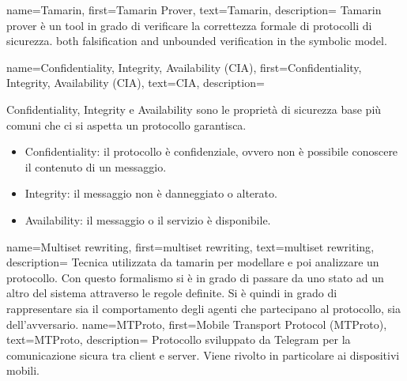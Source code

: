 {
    name={Tamarin},
    first={Tamarin Prover},
    text={Tamarin},
    description={
            Tamarin prover è un tool in grado di verificare la correttezza formale di protocolli di sicurezza.
            both falsification and unbounded verification in the symbolic model.
        }
}
{
    name={Confidentiality, Integrity, Availability (CIA)},
    first={Confidentiality, Integrity, Availability (CIA)},
    text={CIA},
    description={
            Confidentiality, Integrity e Availability sono le proprietà di sicurezza base più comuni che ci si aspetta un protocollo garantisca.
            \begin{itemize}
                \item Confidentiality: il protocollo è confidenziale, ovvero non è possibile conoscere il contenuto di un messaggio.
                \item Integrity: il messaggio non è danneggiato o alterato.
                \item Availability: il messaggio o il servizio è disponibile.
            \end{itemize}
        }
}
{
    name={Multiset rewriting},
    first={multiset rewriting},
    text={multiset rewriting},
    description={
            Tecnica utilizzata da \gls{tamarin} per modellare e poi analizzare un protocollo.
            Con questo formalismo si è in grado di passare da uno stato ad un altro del sistema attraverso le regole definite.
            Si è quindi in grado di rappresentare sia il comportamento degli agenti che partecipano al protocollo, sia dell'avversario.
        }
}
{
    name={MTProto},
    first={Mobile Transport Protocol (MTProto)},
    text={MTProto},
    description={
            Protocollo sviluppato da Telegram per la comunicazione sicura tra client e server.
            Viene rivolto in particolare ai dispositivi mobili.
        }
}
